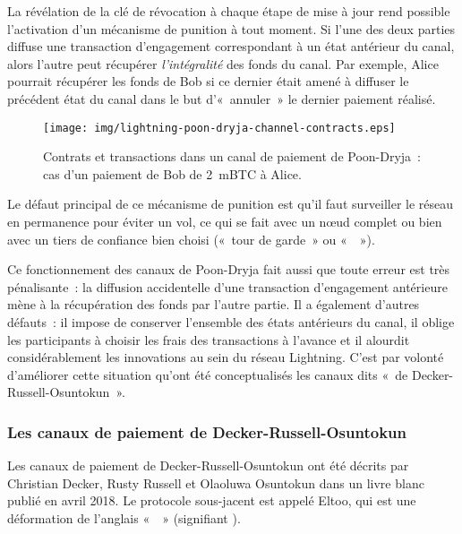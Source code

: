 La révélation de la clé de révocation à chaque étape de mise à jour rend possible l'activation d'un mécanisme de punition à tout moment. Si l'une des deux parties diffuse une transaction d'engagement correspondant à un état antérieur du canal, alors l'autre peut récupérer \emph{l'intégralité} des fonds du canal. Par exemple, Alice pourrait récupérer les fonds de Bob si ce dernier était amené à diffuser le précédent état du canal dans le but d'«~annuler~» le dernier paiement réalisé.

\begin{figure}[ht]
  \centering
  \texttt{[image: img/lightning-poon-dryja-channel-contracts.eps]}
  \caption{Contrats et transactions dans un canal de paiement de Poon-Dryja~: cas d'un paiement de Bob de 2~mBTC à Alice.}
  \label{fig:poon-dryja-contracts}
\end{figure}

Le défaut principal de ce mécanisme de punition est qu'il faut surveiller le réseau en permanence pour éviter un vol, ce qui se fait avec un nœud complet ou bien avec un tiers de confiance bien choisi («~tour de garde~» ou «~~»).

Ce fonctionnement des canaux de Poon-Dryja fait aussi que toute erreur est très pénalisante~: la diffusion accidentelle d'une transaction d'engagement antérieure mène à la récupération des fonds par l'autre partie. Il a également d'autres défauts~: il impose de conserver l'ensemble des états antérieurs du canal, il oblige les participants à choisir les frais des transactions à l'avance et il alourdit considérablement les innovations au sein du réseau Lightning. C'est par volonté d'améliorer cette situation qu'ont été conceptualisés les canaux dits «~de Decker-Russell-Osuntokun~».


\subsubsection*{Les canaux de paiement de Decker-Russell-Osuntokun} Les canaux de paiement de Decker-Russell-Osuntokun ont été décrits par Christian Decker, Rusty Russell et Olaoluwa Osuntokun dans un livre blanc publié en avril 2018. Le protocole sous-jacent est appelé Eltoo, qui est une déformation de l'anglais «~~» (signifiant ).

